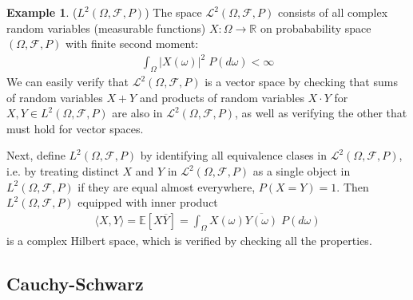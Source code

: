 \documentclass[12pt]{article}
\numberwithin{equation}{section} %
\theoremstyle{plain}
\theoremstyle{definition}
\newtheorem{ex}[thm]{Example}
\theoremstyle{remark}
\newcommand{\ra}{\rightarrow}
\newcommand{\sF}{\mathscr{F}}
\newcommand{\sL}{\mathscr{L}}
\newcommand{\R}{\mathbb{R}}
\newcommand{\E}{\mathbb{E}}
\begin{document}
\begin{ex}($L^2(\Omega,\sF,P)$)
The space $\sL^2(\Omega,\sF,P)$ consists of all complex random variables
(measurable functions) $X:\Omega\ra \R$ on probabability space
$(\Omega,\sF,P)$ with finite second moment:
\begin{align*}
  \int_\Omega |X(\omega)|^2 \; P(d\omega) <\infty
\end{align*}
We can easily verify that $\sL^2(\Omega,\sF,P)$ is a vector space by
checking that sums of random variables $X+Y$ and
products of random variables $X\cdot Y$ for $X,Y\in L^2(\Omega,\sF,P)$
are also in $\sL^2(\Omega,\sF,P)$, as well as verifying the other that
must hold for vector spaces.

Next, define $L^2(\Omega,\sF,P)$ by identifying all equivalence clases
in $\sL^2(\Omega,\sF,P)$, i.e. by treating distinct $X$ and $Y$
in $\sL^2(\Omega,\sF,P)$ as a single object in $L^2(\Omega,\sF,P)$ if
they are equal almost everywhere, $P(X=Y)=1$. Then
$L^2(\Omega,\sF,P)$ equipped with inner product
\begin{align*}
  \langle X,Y \rangle
  = \E[X\overline{Y}]
  = \int_\Omega X(\omega)\overline{Y(\omega)} \; P(d\omega)
\end{align*}
is a complex Hilbert space, which is verified by checking all the
properties.
\end{ex}



\clearpage
\subsection{Cauchy-Schwarz}
\end{document}
